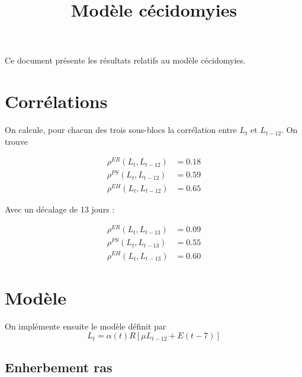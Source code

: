 \documentclass[a4paper, 11pt]{article}
\title{Modèle cécidomyies}
\author{}
\date{}
\begin{document}
\maketitle 


Ce document présente les résultats relatifs au modèle cécidomyies.

\section{Corrélations}



On calcule, pour chacun des trois sous-blocs la corrélation entre $L_t$ et $L_{t-12}$. On trouve

\begin{align}
 \rho^{ER}\left( L_t, L_{t-12} \right) &= 0.18 \\
 \rho^{PS}\left( L_t, L_{t-12} \right) &= 0.59 \\
 \rho^{EH}\left( L_t, L_{t-12} \right) &= 0.65
\end{align}


Avec un décalage de 13 jours :


\begin{align}
 \rho^{ER}\left( L_t, L_{t-13} \right) &= 0.09 \\
 \rho^{PS}\left( L_t, L_{t-13} \right) &= 0.55 \\
 \rho^{EH}\left( L_t, L_{t-13} \right) &= 0.60
\end{align}



\section{Modèle}

On implémente ensuite le modèle définit par 
$$
L_t = \alpha\left( t \right) R \left[\mu L_{t-12} + E(t-7)\right]
$$


\subsection{Enherbement ras}
\end{document}

